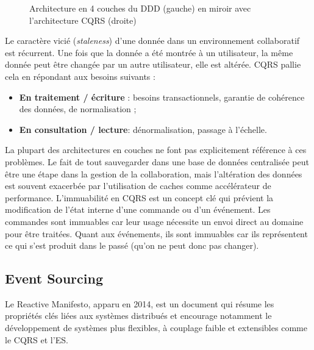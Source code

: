 \begin{figure}[ht]
	\noindent
	\centering
	\caption{Architecture en 4 couches du DDD (gauche) en miroir avec 
		l'architecture CQRS 
		(droite)}
	\label{fig:dddcqrs}
\end{figure}


Le caractère vicié (\textit{staleness}) d'une donnée dans un environnement 
collaboratif est récurrent. Une fois que la donnée a été montrée à un utilisateur, la 
même donnée peut être changée par un autre utilisateur, elle est altérée. 
\gls{CQRS} pallie cela en répondant aux besoins suivants :
\begin{itemize}
	\item \textbf{En traitement / écriture} : besoins transactionnels, garantie de cohérence 
	des données, de normalisation ;
	\item \textbf{En consultation / lecture}: dénormalisation, passage à l'échelle.
\end{itemize}

La plupart des architectures en couches ne font pas explicitement référence à ces 
problèmes. Le fait de tout sauvegarder dans une base de données centralisée peut 
être une étape dans la gestion de la collaboration, mais l'altération des données est 
souvent exacerbée par l'utilisation de caches comme accélérateur de performance.
L'immuabilité en \gls{CQRS} est un concept clé qui prévient la  
modification de l'état interne d'une commande ou d'un événement. Les 
commandes sont immuables car leur usage nécessite un envoi direct au domaine 
pour être traitées. Quant aux événements, ils sont immuables car ils représentent 
ce qui s'est produit dans le passé (qu'on ne peut donc pas changer). 

\subsection{Event Sourcing}
\label{sec:es}

Le Reactive Manifesto, apparu en 2014, est un document qui résume les 
propriétés clés liées aux systèmes distribués et encourage notamment le 
développement de systèmes \og plus flexibles, à couplage faible et 
extensibles\fg{}\cite{Boner2014} comme le \gls{CQRS} et l'\gls{ES}.

